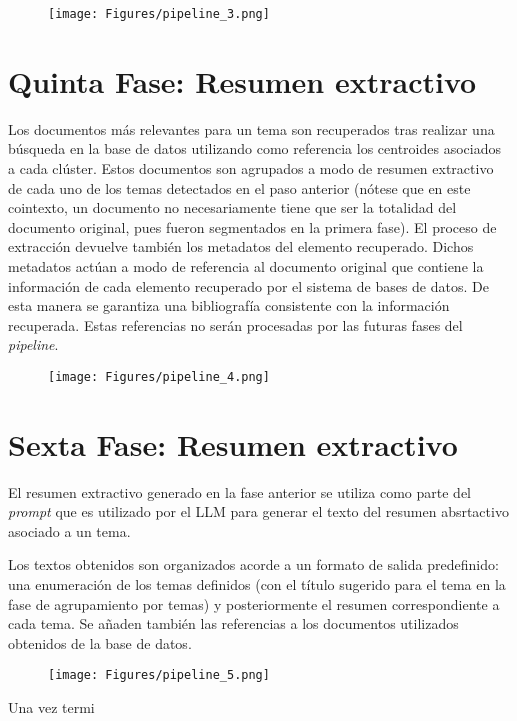     \begin{figure}[H]    
        \centering
        \texttt{[image: Figures/pipeline\_3.png]}
        \caption*{}
    \end{figure}

    \section{Quinta Fase: Resumen extractivo} 
    Los documentos más relevantes para un tema son recuperados tras realizar una búsqueda en la base de datos utilizando como referencia los centroides asociados a cada clúster. Estos documentos son agrupados a modo de resumen extractivo de cada uno de los temas detectados en el paso anterior (nótese que en este cointexto, un documento no necesariamente tiene que ser la totalidad del documento original, pues fueron segmentados en la primera fase). El proceso de extracción devuelve también los metadatos del elemento recuperado. Dichos metadatos actúan a modo de referencia al documento original que contiene la información de cada elemento recuperado por el sistema de bases de datos. De esta manera se garantiza una bibliografía consistente con la información recuperada. Estas referencias no serán procesadas por las futuras fases del \emph{pipeline}.
    
    \begin{figure}[H]    
        \centering
        \texttt{[image: Figures/pipeline\_4.png]}
        \caption*{}
    \end{figure}

    \section{Sexta Fase: Resumen extractivo}
    El resumen extractivo generado en la fase anterior se utiliza como parte del \emph{prompt} que es utilizado por el LLM para generar el texto del resumen absrtactivo asociado a un tema.

    Los textos obtenidos son organizados acorde a un formato de salida predefinido: una enumeración de los temas definidos (con el título sugerido para el tema en la fase de agrupamiento por temas) y posteriormente el resumen correspondiente a cada tema. Se añaden también las referencias a los documentos utilizados obtenidos de la base de datos.

    \begin{figure}[H]    
        \centering
        \texttt{[image: Figures/pipeline\_5.png]}
        \caption*{}
    \end{figure}

    Una vez termi